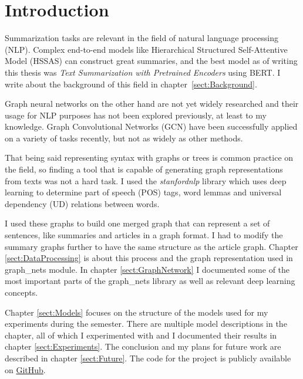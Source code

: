 \chapter*{Introduction}\label{sect:Introduction}

Summarization tasks are relevant in the field of natural language processing (NLP). Complex end-to-end models like Hierarchical Structured Self-Attentive Model (HSSAS) \cite{HSSAS} can construct great summaries, and the best model as of writing this thesis was \textit{Text Summarization with Pretrained Encoders}\cite{BERTsum} using BERT. I write about the background of this field in chapter~\ref{sect:Background}.

Graph neural networks on the other hand are not yet widely researched and their usage for NLP purposes has not been explored previously, at least to my knowledge. Graph Convolutional Networks (GCN) have been successfully applied on a variety of tasks recently, but not as widely as other methods.

That being said representing syntax with graphs or trees is common practice on the field, so finding a tool that is capable of generating graph representations from texts was not a hard task. I used the \textit{stanfordnlp} library which uses deep learning to determine part of speech (POS) tags, word lemmas and universal dependency (UD) relations between words.

I used these graphs to build one merged graph that can represent a set of sentences, like summaries and articles in a graph format. I had to modify the summary graphs further to have the same structure as the article graph. Chapter \ref{sect:DataProcessing} is about this process and the graph representation used in graph\_nets module. In chapter \ref{sect:GraphNetwork} I documented some of the most important parts of the graph\_nets library as well as relevant deep learning concepts.

Chapter \ref{sect:Models} focuses on the structure of the models used for my experiments during the semester. There are multiple model descriptions in the chapter, all of which I experimented with and I documented their results in chapter \ref{sect:Experiments}. The conclusion and my plans for future work are described in chapter \ref{sect:Future}. The code for the project is publicly available on \href{https://github.com/GKingA/graph\_transformations}{GitHub}.
